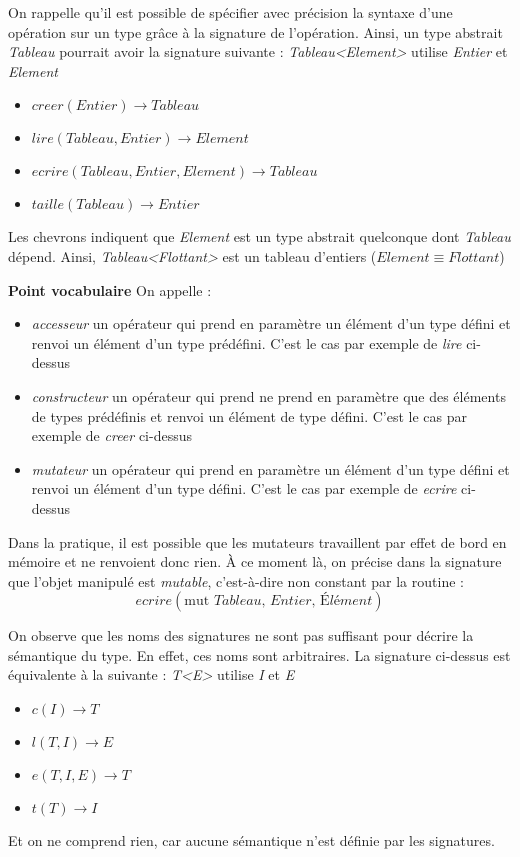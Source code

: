 \documentclass[../../../main.tex]{subfiles}
\begin{document}
On rappelle qu'il est possible de spécifier avec précision la syntaxe d'une opération sur un type grâce à la signature de l'opération. Ainsi, un type abstrait \textit{Tableau} pourrait avoir la signature suivante :\newline
\textit{Tableau\textless Element\textgreater} utilise \textit{Entier} et \textit{Element}
\begin{itemize}
	\item $creer(Entier) \rightarrow Tableau$
	\item $lire(Tableau, Entier) \rightarrow Element$
	\item $ecrire(Tableau, Entier, Element) \rightarrow Tableau$
	\item $taille(Tableau) \rightarrow Entier$
\end{itemize}
Les chevrons indiquent que \textit{Element} est un type abstrait quelconque dont \textit{Tableau} dépend. Ainsi, \textit{Tableau\textless Flottant\textgreater} est un tableau d'entiers ($Element\equiv Flottant$)
\begin{minitelbasicbox}{\textbf{Point vocabulaire}}
On appelle :
\begin{itemize}
	\item \textit{accesseur} un opérateur qui prend en paramètre un élément d'un type défini et renvoi un élément d'un type prédéfini. C'est le cas par exemple de \textit{lire} ci-dessus
	\item \textit{constructeur} un opérateur qui prend ne prend en paramètre que des éléments de types prédéfinis et renvoi un élément de type défini. C'est le cas par exemple de \textit{creer} ci-dessus
	\item \textit{mutateur} un opérateur qui prend en paramètre un élément d'un type défini et renvoi un élément d'un type défini. C'est le cas par exemple de \textit{ecrire} ci-dessus
\end{itemize}
Dans la pratique, il est possible que les mutateurs travaillent par effet de bord en mémoire et ne renvoient donc rien. À ce moment là, on précise dans la signature que l'objet manipulé est \textit{mutable}, c'est-à-dire non constant par la routine : $$ecrire(\text{mut}\textit{ Tableau, Entier, Élément})$$
\end{minitelbasicbox}
On observe que les noms des signatures ne sont pas suffisant pour décrire la sémantique du type. En effet, ces noms sont arbitraires. La signature ci-dessus est équivalente à la suivante :
\textit{T\textless E\textgreater} utilise \textit{I} et \textit{E}
\begin{itemize}
	\item $c(I) \rightarrow T$
	\item $l(T, I) \rightarrow E$
	\item $e(T,I, E) \rightarrow T$
	\item $t(T)\rightarrow I$
\end{itemize}
Et on ne comprend rien, car aucune sémantique n'est définie par les signatures.
\end{document}
